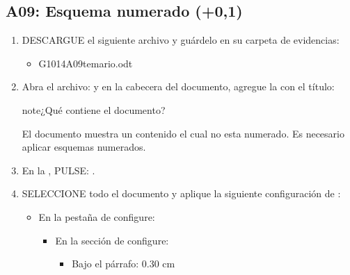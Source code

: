 \documentclass[letterpaper,10pt,spanish]{sphinxmanual}
\begin{document}
\subsection{A09: Esquema numerado  (+0,1)}
\label{\detokenize{1_guias/10ofimatica/G1014:a09-esquema-numerado-102-0-1}}
\sphinxAtStartPar
{}
\begin{enumerate}
%
\item {} 
\sphinxAtStartPar
DESCARGUE el siguiente archivo y guárdelo en su carpeta de evidencias:
\begin{itemize}
\item {} 
\sphinxAtStartPar
G1014A09\sphinxhyphen{}temario.odt 

\end{itemize}

\item {} 
\sphinxAtStartPar
Abra el archivo:  y en la cabecera del documento, agregue la  con el título: 

\begin{sphinxadmonition}{note}{¿Qué contiene el documento?}

\sphinxAtStartPar
El documento muestra un contenido el cual no esta numerado. Es necesario aplicar esquemas numerados.
\end{sphinxadmonition}

\item {} 
\sphinxAtStartPar
En la , PULSE: .

\item {} 
\sphinxAtStartPar
SELECCIONE todo el documento y aplique la siguiente configuración de :
\begin{itemize}
\item {} 
\sphinxAtStartPar
En la pestaña de  configure:
\begin{itemize}
\item {} 
\sphinxAtStartPar
En la sección de  configure:
\begin{itemize}
\item {} 
\sphinxAtStartPar
Bajo el párrafo: 0.30 cm


\end{itemize}
\end{itemize}
\end{itemize}
\end{enumerate}
\end{document}

